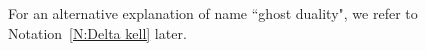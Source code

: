 \documentclass[12pt]{amsart}
\theoremstyle{definition}
\newtheorem{remark}[subsection]{Remark}
\numberwithin{equation}{subsection}
\newcommand{\new}{\mathrm{new}}
\newcommand{\unr}{\mathrm{ur}}
\begin{document}
For an alternative explanation of name ``ghost duality", we refer to Notation~\ref{N:Delta kell} later.
\end{document}
